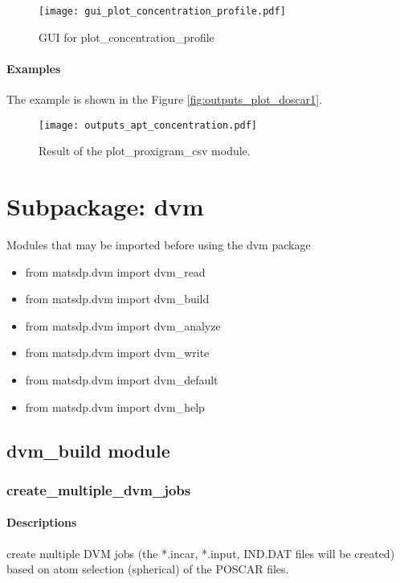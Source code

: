 \documentclass[12pt]{book}
\begin{document}
\begin{figure}[htbp]
\centering
\texttt{[image: gui\_plot\_concentration\_profile.pdf]}
\caption{GUI for plot\_concentration\_profile}
\label{fig:GUI_gui_plot_concentration_profile}
\end{figure}

\subsubsection{Examples}

The example is shown in the Figure \ref{fig:outputs_plot_doscar1}.

\begin{figure}[htbp]
\centering
\texttt{[image: outputs\_apt\_concentration.pdf]}
\caption{Result of the plot\_proxigram\_csv module.}
\label{fig:outputs_apt_concentration}
\end{figure}


\chapter{Subpackage: dvm}

Modules that may be imported before using the dvm package
\begin{itemize}
\item from matsdp.dvm import dvm\_read
\item from matsdp.dvm import dvm\_build
\item from matsdp.dvm import dvm\_analyze
\item from matsdp.dvm import dvm\_write
\item from matsdp.dvm import dvm\_default
\item from matsdp.dvm import dvm\_help
\end{itemize}

\section{dvm\_build module}
\subsection{create\_multiple\_dvm\_jobs}
\subsubsection{Descriptions}
create multiple DVM jobs (the *.incar, *.input, IND.DAT files will be created) based on atom selection (spherical) of the POSCAR files.
 
\end{document}

